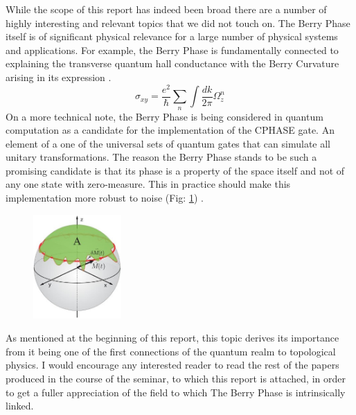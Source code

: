 \documentclass{article}
\begin{document}
  While the scope of this report has indeed been broad there are a number of highly interesting and relevant topics that we did not touch on. The Berry Phase itself is of significant physical relevance for a large number of physical systems and applications. For example, the Berry Phase is fundamentally connected to explaining the transverse quantum hall conductance with the Berry Curvature arising in its expression  \cite{Cohen2019}.
  \begin{equation*}
    \sigma_{xy} = \frac{e^{2}}{\hbar} \sum_{n} \int \frac{dk}{2\pi} \Omega_{z}^{n}
  \end{equation*}
  On a more technical note, the Berry Phase is being considered in quantum computation as a candidate for the implementation of the CPHASE gate. An element of a one of the universal sets of quantum gates that can simulate all unitary transformations. The reason the Berry Phase stands to be such a promising candidate is that its phase is a property of the space itself and not of any one state with zero-measure. This in practice should make this implementation more robust to noise (Fig: \ref{fig:geo_qbit}) \cite{Thapa}.
    
    \begin{figure}
      \centering
      \includegraphics[width=0.3\textwidth]{geo_qbit}
      \label{fig:geo_qbit}
    \end{figure}

As mentioned at the beginning of this report, this topic derives its importance from it being one of the first connections of the quantum realm to topological physics. I would encourage any interested reader to read the rest of the papers produced in the course of the seminar, to which this report is attached, in order to get a fuller appreciation of the field to which The Berry Phase is intrinsically linked.

\newpage


\end{document}
